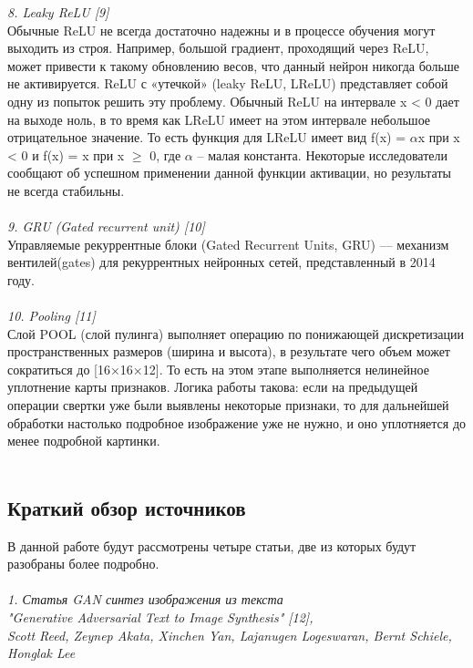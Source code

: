 \documentclass{article}
\begin{document}
    \textit{8. Leaky ReLU [9]}
    \\
    Обычные ReLU не всегда достаточно надежны и в процессе обучения могут выходить из строя. Например, большой градиент, проходящий через ReLU, может привести к такому обновлению весов, что данный нейрон никогда больше не активируется. 
    ReLU с «утечкой» (leaky ReLU, LReLU) представляет собой одну из попыток решить эту проблему. Обычный ReLU на интервале x < 0 дает на выходе ноль, в то время как LReLU имеет на этом интервале небольшое отрицательное значение. То есть функция для LReLU имеет вид  f(x) = $\alpha$x при x < 0 и f(x) = x при x $\geqslant$ 0, где $\alpha$ – малая константа. Некоторые исследователи сообщают об успешном применении данной функции активации, но результаты не всегда стабильны.
    \\ \\
    \textit{9. GRU (Gated recurrent unit) [10]}
    \\
    Управляемые рекуррентные блоки (Gated Recurrent Units, GRU) — механизм вентилей(gates) для рекуррентных нейронных сетей, представленный в 2014 году. 
    \\ \\
    \textit{10. Pooling [11]}
    \\
    Слой POOL (слой пулинга) выполняет операцию по понижающей дискретизации пространственных размеров (ширина и высота), в результате чего объем может сократиться до [16×16×12]. То есть на этом этапе выполняется нелинейное уплотнение карты признаков. Логика работы такова: если на предыдущей операции свертки уже были выявлены некоторые признаки, то для дальнейшей обработки настолько подробное изображение уже не нужно, и оно уплотняется до менее подробной картинки.
    \\ \\
    \newpage
    \begin{center} 
    \section{Краткий обзор источников}
    \end{center}
    \large 
    В данной работе будут рассмотрены четыре статьи, две из которых будут разобраны более подробно.
    \\ \\
    \textit{1. Статья GAN синтез изображения из текста
    \\
    "Generative Adversarial Text to Image Synthesis" [12], 
    \\
    Scott Reed, Zeynep Akata, Xinchen Yan, Lajanugen Logeswaran, Bernt Schiele, Honglak Lee}
    \\
\end{document}
